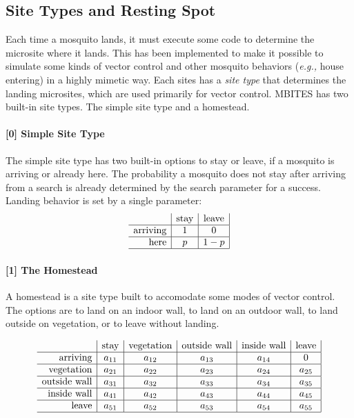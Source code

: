 \documentclass{article}
\newcommand{\eg}{{\em e.g., }}
\begin{document}
\subsection{Site Types and Resting Spot}

Each time a mosquito lands, it must execute some code to determine the microsite where it lands. This has been implemented to make it possible to simulate some kinds of vector control and other mosquito behaviors (\eg house entering) in a highly mimetic way. Each sites has a {\em site type} that determines the landing microsites, which are used primarily for vector control. MBITES has two built-in site types. The simple site type and a homestead. 

\paragraph{[0] Simple Site Type}

The simple site type has two built-in options to stay or leave, if a mosquito is arriving or already here. The probability a mosquito does not stay after arriving from a search is already determined by the search parameter for a success. Landing behavior is set by a single parameter:
\begin{equation}
\begin{array}{r|c|c|}
& \mbox{stay} & \mbox{leave} \\ \hline  
\mbox{arriving} & 1 & 0 \\ \hline 
\mbox{here} & p & 1-p \\ \hline 
\end{array}
\end{equation}

\paragraph{[1] The Homestead}

A homestead is a site type built to accomodate some modes of vector control. The options are to land on an indoor wall, to land on an outdoor wall, to land outside on vegetation, or to leave without landing.  

\begin{equation}
\begin{array}{r|c|c|c|c|c|}
& \mbox{stay} & \mbox{vegetation} & \mbox{outside wall} & \mbox{inside wall} & \mbox{leave}  \\ \hline  
\mbox{arriving} & a_{11} & a_{12} & a_{13} & a_{14} & 0\\ \hline 
\mbox{vegetation} & a_{21} &  a_{22} & a_{23} & a_{24} & a_{25} \\ \hline 
\mbox{outside wall} & a_{31} &  a_{32} & a_{33} & a_{34} & a_{35} \\ \hline 
\mbox{inside wall} & a_{41} &  a_{42} & a_{43} & a_{44} & a_{45} \\ \hline 
\mbox{leave} & a_{51} &  a_{52} & a_{53} & a_{54} & a_{55} \\ \hline 
\end{array}
\end{equation}
\end{document}
